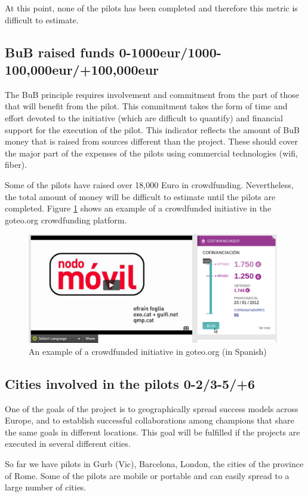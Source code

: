 \documentclass[draftclsnofoot,12pt,journal,onecolumn]{IEEEtran}
\begin{document}
At this point, none of the pilots has been completed and therefore this metric is difficult to estimate.

\subsection{BuB raised funds 0-1000eur/1000-100,000eur/+100,000eur}
The BuB principle requires involvement and commitment from the part of
those that will benefit from the pilot. This commitment takes the form
of time and effort devoted to the initiative (which are difficult to
quantify) and financial support for the execution of the pilot. This
indicator reflects the amount of BuB money that is raised from sources
different than the project. These should cover the major part of the
expenses of the pilots using commercial technologies (wifi, fiber).

Some of the pilots have raised over 18,000 Euro in crowdfunding.
Nevertheless, the total amount of money will be difficult to estimate until the pilots are completed.
Figure \ref{fig:crowdfunded} shows an example of a crowdfunded initiative in the goteo.org crowdfunding platform.

\begin{figure}[htbp]
  \centering
  \includegraphics[width = 11cm]{figures/crowdfunded.eps}
  \caption{An example of a crowdfunded initiative in goteo.org (in Spanish)}
  \label{fig:crowdfunded}
\end{figure}

\subsection{Cities  involved in the pilots 0-2/3-5/+6}
One of the goals of the project is to geographically spread success
models across Europe, and to establish successful collaborations among
champions that share the same goals in different locations. This goal
will be fulfilled if the projects are executed in several different
cities.

So far we have pilots in Gurb (Vic), Barcelona, London, the cities of the province of Rome.
Some of the pilots are mobile or portable and can easily spread to a large number of cities.
\end{document}
